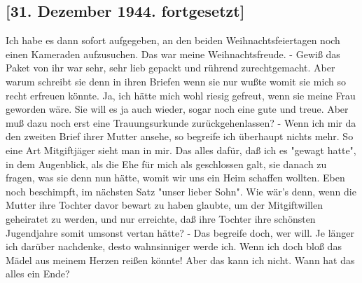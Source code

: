 \subsection{{\color{red} [31. Dezember 1944. fortgesetzt] }}

Ich habe es dann sofort aufgegeben, an den beiden Weihnachtsfeiertagen noch einen Kameraden aufzusuchen.
Das war meine Weihnachtsfreude.
- Gewi{\ss} das Paket von ihr war sehr, sehr lieb gepackt und r\"{u}hrend zurechtgemacht.
Aber warum schreibt sie denn in ihren Briefen wenn sie nur wu{\ss}te womit sie mich so recht erfreuen k\"{o}nnte.
Ja, ich h\"{a}tte mich wohl riesig gefreut, wenn sie meine Frau geworden w\"{a}re.
Sie will es ja auch wieder, sogar noch eine gute und treue.
Aber mu{\ss} dazu noch erst eine Trauungsurkunde zur\"{u}ckgehenlassen? -
Wenn ich mir da den zweiten Brief ihrer Mutter ansehe, so begreife ich \"{u}berhaupt nichts mehr.
So eine Art Mitgiftj\"{a}ger sieht man in mir.
Das alles daf\"{u}r, da{\ss} ich es "gewagt hatte", in dem Augenblick, als die Ehe f\"{u}r mich als geschlossen galt, sie danach zu fragen, was sie denn nun h\"{a}tte, womit wir uns ein Heim schaffen wollten.
Eben noch beschimpft, im n\"{a}chsten Satz "unser lieber Sohn".
Wie w\"{a}r's denn, wenn die Mutter ihre Tochter davor bewart zu haben glaubte, um der Mitgiftwillen geheiratet zu werden, und nur erreichte, da{\ss} ihre Tochter ihre sch\"{o}nsten Jugendjahre somit umsonst vertan h\"{a}tte? -
Das begreife doch, wer will.
Je l\"{a}nger ich dar\"{u}ber nachdenke, desto wahnsinniger werde ich.
Wenn ich doch blo{\ss} das M\"{a}del aus meinem Herzen rei{\ss}en k\"{o}nnte!
Aber das kann ich nicht.
Wann hat das alles ein Ende?

\clearpage
